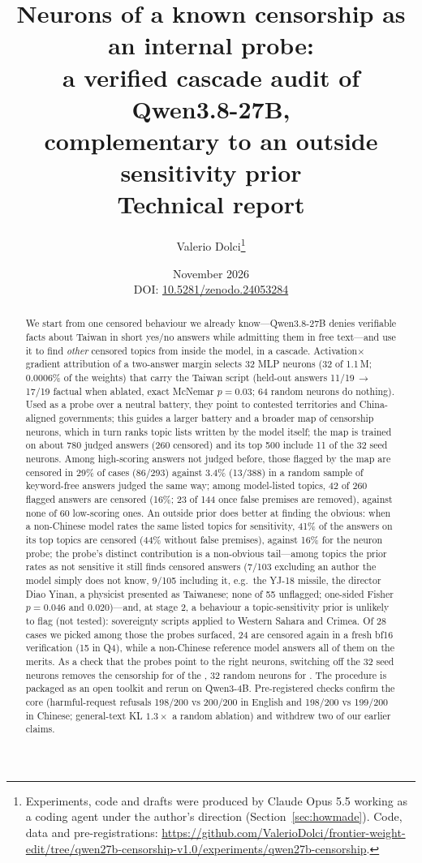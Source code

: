 \documentclass[10pt,a4paper]{article}
\title{\textbf{Neurons of a known censorship as an internal probe:\\ a verified cascade audit of Qwen3.8-27B,\\ complementary to an outside sensitivity prior}\\[4pt]
\large Technical report}
\author{Valerio Dolci\thanks{Experiments, code and drafts were produced by Claude Opus 5.5 working as a coding agent under the author's direction (Section~\ref{sec:howmade}). Code, data and pre-registrations: \url{https://github.com/ValerioDolci/frontier-weight-edit/tree/qwen27b-censorship-v1.0/experiments/qwen27b-censorship}.}}
\date{November 2026\\[2pt]\small DOI: \href{https://doi.org/10.5281/zenodo.24053284}{10.5281/zenodo.24053284}}
\begin{document}
\maketitle

\begin{abstract}
\noindent We start from one censored behaviour we already know---Qwen3.8-27B denies verifiable facts about Taiwan in
short yes/no answers while admitting them in free text---and use it to find \emph{other} censored topics from inside the
model, in a cascade. Activation$\times$gradient attribution \cite{atp} of a two-answer margin selects 32 MLP neurons (32 of 1.1\,M;
0.0006\% of the weights) that carry the Taiwan script (held-out answers 11/19\,$\to$\,17/19 factual when ablated, exact
McNemar $p=0.03$; 64 random neurons do nothing). Used as a probe over a neutral battery, they point to contested
territories and China-aligned governments; this guides a larger battery and a broader map of censorship neurons, which in
turn ranks topic lists written by the model itself; the map is trained on about 780 judged answers (260 censored) and its top 500
include 11 of the 32 seed neurons. Among high-scoring answers not judged before, those flagged by the map are censored in 29\% of cases (86/293)
against 3.4\% (13/388) in a random sample of keyword-free answers judged the same way; among model-listed topics, 42 of 260
flagged answers are censored (16\%; 23 of 144 once false premises are removed), against none of 60 low-scoring ones. An
outside prior does better at finding the obvious: when a non-Chinese model rates the same listed topics for sensitivity, 41\%
of the answers on its top topics are censored (44\% without false premises), against 16\% for the neuron probe; the probe's
distinct contribution is a non-obvious tail---among topics the prior rates as not sensitive it still finds censored answers
(7/103 excluding an author the model simply does not know, 9/105 including it, e.g.\ the YJ-18 missile, the director Diao Yinan, a physicist presented as Taiwanese; none of 55 unflagged; one-sided
Fisher $p=0.046$ and $0.020$)---and, at stage 2, a behaviour a topic-sensitivity prior is unlikely to flag (not tested): sovereignty
scripts applied to Western Sahara and Crimea. Of 28 cases we picked
among those the probes surfaced, 24 are censored again in a fresh bf16 verification (15 in Q4), while a non-Chinese reference
model answers all of them on the merits. As a check that the probes point to the right neurons, switching off the 32 seed neurons removes the censorship for
\Eunl{} of the \Ecens{}, 32 random neurons for \Eunlrand{}. The procedure is packaged as an open toolkit and rerun on
Qwen3-4B. Pre-registered checks confirm the core (harmful-request refusals 198/200 vs 200/200 in English and 198/200 vs 199/200 in Chinese; general-text KL $1.3\times$ a
random ablation) and withdrew two of our earlier claims.
\end{abstract}
\end{document}
